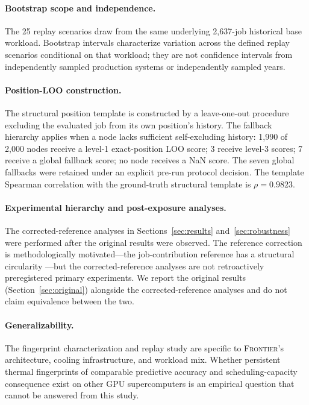 \documentclass[acmsmall,screen,review,anonymous]{acmart}
\newcommand{\Frontier}{\textsc{Frontier}\xspace}
\begin{document}
\paragraph{Bootstrap scope and independence.}
The 25 replay scenarios draw from the same underlying 2,637-job historical base workload.
Bootstrap intervals characterize variation across the defined replay scenarios conditional
on that workload; they are not confidence intervals from independently sampled
production systems or independently sampled years.

\paragraph{Position-LOO construction.}
The structural position template is constructed by a leave-one-out procedure excluding the
evaluated job from its own position's history.  The fallback hierarchy applies when a
node lacks sufficient self-excluding history: 1,990 of 2,000 nodes receive a level-1
exact-position LOO score; 3 receive level-3 scores; 7 receive a global fallback score;
no node receives a NaN score.  The seven global fallbacks were retained under an explicit
pre-run protocol decision.  The template Spearman correlation with the ground-truth
structural template is $\rho = 0.9823$.

\paragraph{Experimental hierarchy and post-exposure analyses.}
The corrected-reference analyses in Sections~\ref{sec:results} and~\ref{sec:robustness}
were performed after the original results were observed.  The reference correction is
methodologically motivated---the job-contribution reference has a structural circularity
---but the corrected-reference analyses are not retroactively preregistered primary
experiments.  We report the original results (Section~\ref{sec:original}) alongside
the corrected-reference analyses and do not claim equivalence between the two.

\paragraph{Generalizability.}
The fingerprint characterization and replay study are specific to \Frontier's architecture,
cooling infrastructure, and workload mix.  Whether persistent thermal fingerprints of
comparable predictive accuracy and scheduling-capacity consequence exist on other GPU
supercomputers is an empirical question that cannot be answered from this study.
\end{document}
